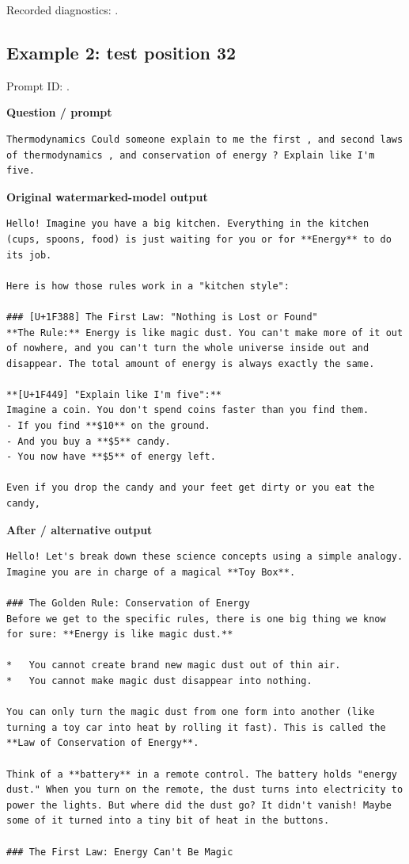 Recorded diagnostics:
\texttt{}.

\subsection{Example 2: test position
32}\label{record-docs-watermarking-qualitative-text-latent-direct-topk-md-example-2-test-position-32}

Prompt ID:
\texttt{}.

\textbf{Question / prompt}

\begin{Verbatim}
Thermodynamics Could someone explain to me the first , and second laws of thermodynamics , and conservation of energy ? Explain like I'm five.
\end{Verbatim}

\textbf{Original watermarked-model output}

\begin{Verbatim}
Hello! Imagine you have a big kitchen. Everything in the kitchen (cups, spoons, food) is just waiting for you or for **Energy** to do its job.

Here is how those rules work in a "kitchen style":

### [U+1F388] The First Law: "Nothing is Lost or Found"
**The Rule:** Energy is like magic dust. You can't make more of it out of nowhere, and you can't turn the whole universe inside out and disappear. The total amount of energy is always exactly the same.

**[U+1F449] "Explain like I'm five":**
Imagine a coin. You don't spend coins faster than you find them.
- If you find **$10** on the ground.
- And you buy a **$5** candy.
- You now have **$5** of energy left.

Even if you drop the candy and your feet get dirty or you eat the candy,
\end{Verbatim}

\textbf{After / alternative output}

\begin{Verbatim}
Hello! Let's break down these science concepts using a simple analogy. Imagine you are in charge of a magical **Toy Box**.

### The Golden Rule: Conservation of Energy
Before we get to the specific rules, there is one big thing we know for sure: **Energy is like magic dust.**

*   You cannot create brand new magic dust out of thin air.
*   You cannot make magic dust disappear into nothing.

You can only turn the magic dust from one form into another (like turning a toy car into heat by rolling it fast). This is called the **Law of Conservation of Energy**.

Think of a **battery** in a remote control. The battery holds "energy dust." When you turn on the remote, the dust turns into electricity to power the lights. But where did the dust go? It didn't vanish! Maybe some of it turned into a tiny bit of heat in the buttons.

### The First Law: Energy Can't Be Magic
\end{Verbatim}

